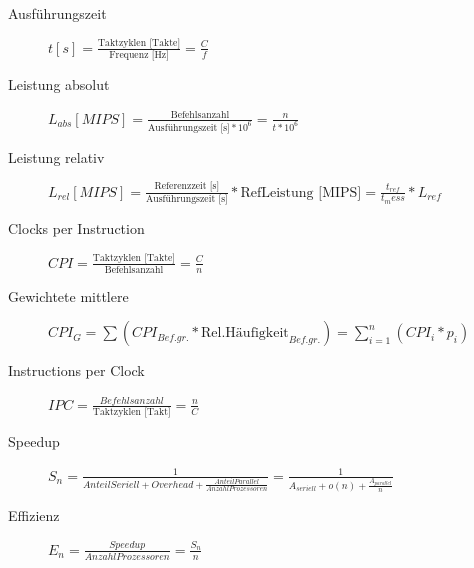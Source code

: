 \documentclass[10pt,landscape]{article}
\begin{document}
\begin{multicols}{2}
  \footnotesize
  \begin{description}
    \item[Ausführungszeit] $t[s]=\frac{\text{Taktzyklen [Takte]}}{\text{Frequenz [Hz]}} =\frac{C}{f}$
    \item[Leistung absolut] $L_{abs}[MIPS]=\frac{\text{Befehlsanzahl}}{\text{Ausführungszeit [s]}*10^6}=\frac{n}{t*10^6}$
    \item[Leistung relativ] $L_{rel}[MIPS]=\frac{\text{Referenzzeit [s]}}{\text{Ausführungszeit [s]}}*\text{RefLeistung [MIPS]} = \frac{t_{ref}}{t_mess}*L_{ref}$
    \item[Clocks per Instruction] $CPI=\frac{\text{Taktzyklen [Takte]}}{\text{Befehlsanzahl}} =\frac{C}{n}$
    \item[Gewichtete mittlere] $CPI_{G}=\sum (CPI_{Bef.gr.}*\text{Rel.Häufigkeit}_{Bef.gr.})=\sum_{i=1}^n(CPI_i*p_i)$
    \item[Instructions per Clock] $IPC=\frac{Befehlsanzahl}{\text{Taktzyklen [Takt]}}=\frac{n}{C}$
    \item[Speedup] $S_n=\frac{1}{AnteilSeriell + Overhead + \frac{AnteilParallel}{AnzahlProzessoren}}=\frac{1}{ A_{seriell} + o(n) + \frac{ A_{parallel} }{ n }}$
    \item[Effizienz] $E_n=\frac{Speedup}{AnzahlProzessoren}=\frac{S_n}{n}$
  \end{description}
\end{multicols}

\end{document}
